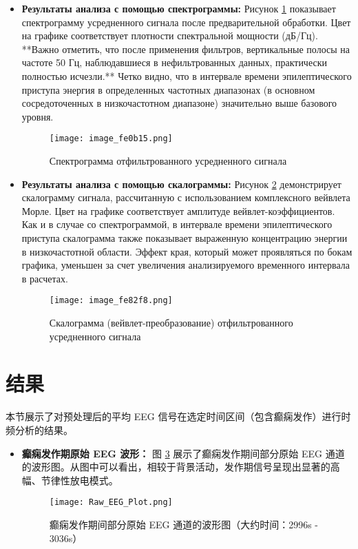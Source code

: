 \documentclass{article}
\providecommand{\pcsync}{\par\vspace{\baselineskip}} %
\begin{document}
\begin{paracol}{2}
\begin{itemize}
 \item \textbf{Результаты анализа с помощью спектрограммы:}
 Рисунок \ref{fig:spectrogram} показывает спектрограмму усредненного сигнала после предварительной обработки. Цвет на графике соответствует плотности спектральной мощности (дБ/Гц). **Важно отметить, что после применения фильтров, вертикальные полосы на частоте 50 Гц, наблюдавшиеся в нефильтрованных данных, практически полностью исчезли.** Четко видно, что в интервале времени эпилептического приступа энергия в определенных частотных диапазонах (в основном сосредоточенных в низкочастотном диапазоне) значительно выше базового уровня.
\begin{figure}[H]
 \centering
 \texttt{[image: image\_fe0b15.png]} %
 \caption{Спектрограмма отфильтрованного усредненного сигнала} %
 \label{fig:spectrogram} %
\end{figure}

 \item \textbf{Результаты анализа с помощью скалограммы:}
 Рисунок \ref{fig:scalogram} демонстрирует скалограмму сигнала, рассчитанную с использованием комплексного вейвлета Морле. Цвет на графике соответствует амплитуде вейвлет-коэффициентов. Как и в случае со спектрограммой, в интервале времени эпилептического приступа скалограмма также показывает выраженную концентрацию энергии в низкочастотной области. Эффект края, который может проявляться по бокам графика, уменьшен за счет увеличения анализируемого временного интервала в расчетах.
\begin{figure}[H]
 \centering
 \texttt{[image: image\_fe82f8.png]} %
 \caption{Скалограмма (вейвлет-преобразование) отфильтрованного усредненного сигнала} %
 \label{fig:scalogram} %
\end{figure}
\end{itemize}

\switchcolumn

\section{结果}
\pcsync

本节展示了对预处理后的平均 EEG 信号在选定时间区间（包含癫痫发作）进行时频分析的结果。

\begin{itemize}
 \item \textbf{癫痫发作期原始 EEG 波形：}
 图 \ref{fig:raw_eeg} 展示了癫痫发作期间部分原始 EEG 通道的波形图。从图中可以看出，相较于背景活动，发作期信号呈现出显著的高幅、节律性放电模式。
\begin{figure}[H]
 \centering
 \texttt{[image: Raw\_EEG\_Plot.png]} %
 \caption{癫痫发作期间部分原始 EEG 通道的波形图（大约时间：2996s - 3036s）} %
 \label{fig:raw_eeg} %
\end{figure}


\end{itemize}
\end{paracol}
\end{document}
